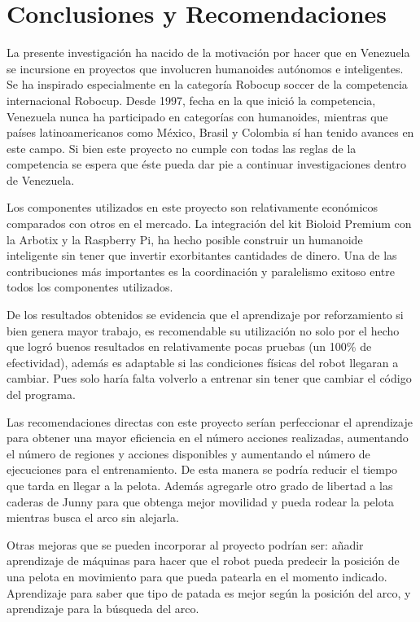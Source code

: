 \chapter{Conclusiones y Recomendaciones} \label{chapter:conclusiones}

\label{chap:conclusiones}

La presente investigación ha nacido de la motivación por hacer que en Venezuela se incursione en proyectos que involucren humanoides autónomos e inteligentes. Se ha inspirado especialmente en la categoría Robocup soccer de la competencia internacional Robocup. Desde 1997, fecha en la que inició la competencia, Venezuela nunca ha participado en categorías con humanoides, mientras que países latinoamericanos como México, Brasil y Colombia sí han tenido avances en este campo. Si bien este proyecto no cumple con todas las reglas de la competencia se espera que éste pueda dar pie a continuar investigaciones dentro de Venezuela.

Los componentes utilizados en este proyecto son relativamente económicos comparados con otros en el mercado. La integración del kit Bioloid Premium con la Arbotix y la Raspberry Pi, ha hecho posible construir un humanoide inteligente sin tener que invertir exorbitantes cantidades de dinero. Una de las contribuciones más importantes es la coordinación y paralelismo exitoso entre todos los componentes utilizados.

De los resultados obtenidos se evidencia que el aprendizaje por reforzamiento si bien genera mayor trabajo, es recomendable su utilizaci\'on no solo por el hecho que logr\'o buenos resultados en relativamente pocas pruebas (un 100\% de efectividad), adem\'as es adaptable si las condiciones f\'isicas del robot llegaran a cambiar. Pues solo haría falta volverlo a entrenar sin tener que cambiar el código del programa.
 
Las recomendaciones directas con este proyecto ser\'ian perfeccionar el aprendizaje para obtener una mayor eficiencia en el n\'umero acciones realizadas, aumentando el número de regiones y acciones disponibles y aumentando el número de ejecuciones para el entrenamiento. De esta manera se podría reducir el tiempo que tarda en llegar a la pelota. Además agregarle otro grado de libertad a las caderas de Junny para que obtenga mejor movilidad y pueda rodear la pelota mientras busca el arco sin alejarla. 

Otras mejoras que se pueden incorporar al proyecto podrían ser: añadir aprendizaje de m\'aquinas para hacer que el robot pueda predecir la posición de una pelota en movimiento para que pueda patearla en el momento indicado. Aprendizaje para saber que tipo de patada es mejor seg\'un la posición del arco, y aprendizaje para la búsqueda del arco.


